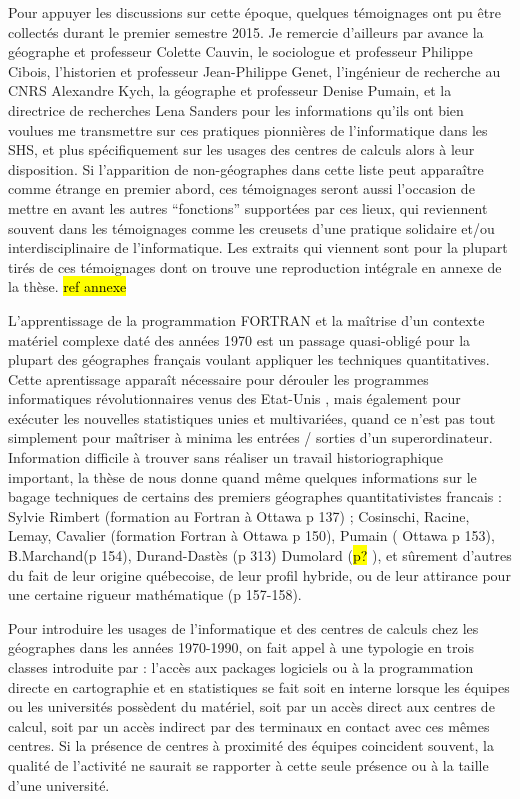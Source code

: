 Pour appuyer les discussions sur cette époque, quelques témoignages ont pu être collectés durant le premier semestre 2015. Je remercie d'ailleurs par avance la géographe et professeur Colette Cauvin, le sociologue et professeur Philippe Cibois, l'historien et professeur Jean-Philippe Genet, l'ingénieur de recherche au CNRS Alexandre Kych, la géographe et professeur Denise Pumain, et la directrice de recherches Lena Sanders pour les informations qu'ils ont bien voulues me transmettre sur ces pratiques pionnières de l'informatique dans les SHS, et plus spécifiquement sur les usages des centres de calculs alors à leur disposition. Si l'apparition de non-géographes dans cette liste peut apparaître comme étrange en premier abord, ces témoignages seront aussi l'occasion de mettre en avant les autres \enquote{fonctions} supportées par ces lieux, qui reviennent souvent dans les témoignages comme les creusets d'une pratique solidaire et/ou interdisciplinaire de l'informatique. Les extraits qui viennent sont pour la plupart tirés de ces témoignages dont on trouve une reproduction intégrale en annexe de la thèse. \hl{ref annexe}

L'apprentissage de la programmation FORTRAN et la maîtrise d'un contexte matériel complexe daté des années 1970 est un passage quasi-obligé pour la plupart des géographes français voulant appliquer les techniques quantitatives. Cette aprentissage apparaît nécessaire pour dérouler les programmes informatiques révolutionnaires venus des Etat-Unis \autocite[150,127]{Cuyala2014}, mais également pour exécuter les nouvelles statistiques unies et multivariées, quand ce n’est pas tout simplement pour maîtriser à minima les entrées / sorties d’un superordinateur. Information difficile à trouver sans réaliser un travail historiographique important, la thèse de \textcite{Cuyala2014} nous donne quand même quelques informations sur le bagage techniques de certains des premiers géographes quantitativistes francais : Sylvie Rimbert (formation au Fortran à Ottawa p 137) ;  Cosinschi, Racine, Lemay, Cavalier (formation Fortran à Ottawa p 150), Pumain ( Ottawa p 153), B.Marchand(p 154), Durand-Dastès (p 313) Dumolard (\hl{p?} ), et sûrement d’autres du fait de leur origine québecoise, de leur profil hybride, ou de leur attirance pour une certaine rigueur mathématique (p 157-158).

Pour introduire les usages de l'informatique et des centres de calculs chez les géographes dans les années 1970-1990, on fait appel à une typologie en trois classes introduite par \textcites{Wieber1980}[448]{Joliveau2004} : l’accès aux packages logiciels ou à la programmation directe en cartographie et en statistiques se fait soit en interne lorsque les équipes ou les universités possèdent du matériel, soit par un accès direct aux centres de calcul, soit par un accès indirect par des terminaux en contact avec ces mêmes centres. Si la présence de centres à proximité des équipes coincident souvent, la qualité de l'activité ne saurait se rapporter à cette seule présence ou à la taille d'une université.

